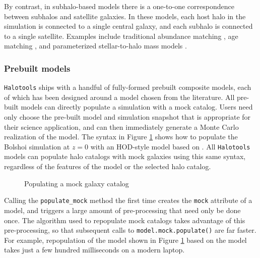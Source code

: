 \documentclass[twocolumn, tighten]{aastex6}
\begin{document}
By contrast, in subhalo-based models there is a one-to-one correspondence between subhalos and satellite galaxies. In these models, each host halo in the simulation is connected to a single central galaxy, and each subhalo is connected to a single satellite. Examples include traditional abundance matching \citep{kravtsov04a,conroy06}, age matching \citep{hearin_etal13b}, and parameterized stellar-to-halo mass models  \citep{behroozi10, moster10}.

\subsubsection{Prebuilt models}
\label{subsubsection:prebuiltmodels}

{\tt Halotools} ships with a handful of fully-formed prebuilt composite models, each of which has been designed around a model chosen from the literature. All pre-built models can directly populate a simulation with a mock catalog. Users need only choose the pre-built model and simulation snapshot that is appropriate for their science application, and can then immediately generate a Monte Carlo realization of the model. The syntax in Figure \ref{code:mockpop} shows how to populate the Bolshoi simulation at $z=0$ with an HOD-style model based on \citet{leauthaud11b}. All {\tt Halotools} models can populate halo catalogs with mock galaxies using this same syntax, regardless of the features of the model or the selected halo catalog.

 \begin{figure}
\center
\caption{Populating a mock galaxy catalog\label{code:mockpop}}
\vspace{0.1in}
\end{figure}

Calling the {\tt populate\_mock} method the first time creates the {\tt mock} attribute of a model, and triggers a large amount of pre-processing that need only be done once. The algorithm used to repopulate mock catalogs takes advantage of this pre-processing, so that subsequent calls to {\tt model.mock.populate()} are far faster. For example, repopulation of the model shown in Figure \ref{code:mockpop} based on the \citet{leauthaud11b} model takes just a few hundred milliseconds on a modern laptop.
\end{document}

